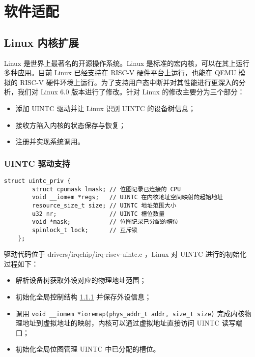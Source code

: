 
\chapter{软件适配}

\section{Linux 内核扩展}

Linux \cite{linux} 是世界上最著名的开源操作系统。Linux 是标准的宏内核，可以在其上运行多种应用。目前 Linux 已经支持在 RISC-V 硬件平台上运行，也能在 QEMU 模拟的 RISC-V 硬件环境上运行。为了支持用户态中断并对其性能进行更深入的分析，我们对 Linux 6.0 版本进行了修改。针对 Linux 的修改主要分为三个部分：

\begin{itemize}
    \item 添加 UINTC 驱动并让 Linux 识别 UINTC 的设备树信息；
    \item 接收方陷入内核的状态保存与恢复；
    \item 注册并实现系统调用。
\end{itemize}

\subsection{UINTC 驱动支持}

\label{code:uintcpriv}
\begin{lstlisting}[style=CStyle]
    struct uintc_priv {
        struct cpumask lmask; // 位图记录已连接的 CPU
        void __iomem *regs;   // UINTC 在内核地址空间映射的起始地址
        resource_size_t size; // UINTC 地址范围大小
        u32 nr;               // UINTC 槽位数量
        void *mask;           // 位图记录已分配的槽位
        spinlock_t lock;      // 互斥锁
    };
\end{lstlisting}

驱动代码位于 drivers/irqchip/irq-riscv-uintc.c ，Linux 对 UINTC 进行的初始化过程如下：

\begin{itemize}
    \item 解析设备树获取外设对应的物理地址范围；
    \item 初始化全局控制结构 \ref{code:uintcpriv} 并保存外设信息；
    \item 调用 \texttt{void __iomem *ioremap(phys_addr_t addr, size_t size)} 完成内核物理地址到虚拟地址的映射，内核可以通过虚拟地址直接访问 UINTC 读写端口；
    \item 初始化全局位图管理 UINTC 中已分配的槽位。
\end{itemize}

